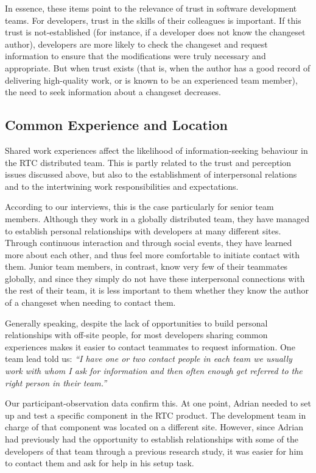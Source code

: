 In essence, these items point to the relevance of trust in software development teams. For developers, trust in the skills of their colleagues is important. If this trust is not-established (for instance, if a developer does not know the changeset author), developers are more likely to check the changeset and request information to ensure that the modifications were truly necessary and appropriate. But when trust exists (that is, when the author has a good record of delivering high-quality work, or is known to be an experienced team member), the need to seek information about a changeset decreases. 


\subsection{Common Experience and Location}
Shared work experiences affect the likelihood of information-seeking behaviour in the RTC distributed team. This is partly related to the trust and perception issues discussed above, but also to the establishment of interpersonal relations and to the intertwining work responsibilities and expectations.

According to our interviews, this is the case particularly for senior team members. Although they work in a globally distributed team, they have managed to establish personal relationships with developers at many different sites. Through continuous interaction and through social events, they have learned more about each other, and thus feel more comfortable to initiate contact with them. Junior team members, in contrast, know very few of their teammates globally, and since they simply do not have these interpersonal connections with the rest of their team, it is less important to them whether they know the author of a changeset when needing to contact them.

Generally speaking, despite the lack of opportunities to build personal relationships with off-site people, for most developers sharing common experiences makes it easier to contact teammates to request information. One team lead told us: \emph{``I have one or two contact people in each team we usually work with whom I ask for information and then often enough get referred to the right person in their team.''}

Our participant-observation data confirm this. At one point, Adrian needed to set up and test a specific component in the RTC product. The development team in charge of that component was located on a different site. However, since Adrian had previously had the opportunity to establish relationships with some of the developers of that team through a previous research study, it was easier for him to contact them and ask for help in his setup task.

